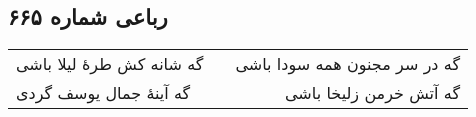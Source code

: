 \begin{center}
\section*{رباعی شماره ۶۶۵}
\label{sec:sh665}
\begin{longtable}{l p{0.5cm} r}
گه شانه کش طرهٔ لیلا باشی
&&
گه در سر مجنون همه سودا باشی
\\
گه آینهٔ جمال یوسف گردی
&&
گه آتش خرمن زلیخا باشی
\\
\end{longtable}
\end{center}
